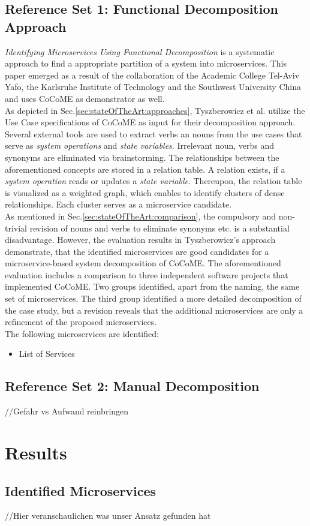 \subsection{Reference Set 1: Functional Decomposition Approach}
\textit{Identifying Microservices Using Functional Decomposition} \cite{FunctionalDecompositionHeinrich} is a systematic approach to find a appropriate partition of a system into microservices. This paper emerged as a result of the collaboration of the Academic College Tel-Aviv Yafo, the Karlsruhe Institute of Technology and the Southwest University China and uses CoCoME as demonstrator as well.\\
As depicted in Sec.\ref{sec:stateOfTheArt:approaches}, Tyszberowicz et al. utilize the Use Case specifications of CoCoME \cite{CoCoMEOld} as input for their decomposition approach. Several external tools are used to extract verbs an nouns from the use cases that serve as \textit{system operations} and \textit{state variables}. Irrelevant noun, verbs and synonyms are eliminated via brainstorming. The relationships between the aforementioned concepts are stored in a relation table. A relation exists, if a \textit{system operation} reads or updates a \textit{state variable}. Thereupon, the relation table is visualized as a weighted graph, which enables to identify clusters of dense relationships. Each cluster serves as a microservice candidate.\\
As mentioned in Sec.\ref{sec:stateOfTheArt:comparison}, the compulsory and non-trivial revision of nouns and verbs to eliminate synonyms etc. is a substantial disadvantage. However, the evaluation results in Tyszberowicz's approach demonstrate, that the identified microservices are good candidates for a microservice-based system decomposition of CoCoME. The aforementioned evaluation includes a comparison to three independent software projects that implemented CoCoME. Two groups identified, apart from the naming, the same set of microservices. The third group identified a more detailed decomposition of the case study, but a revision reveals that the additional microservices are only a refinement of the proposed microservices. \\
The following microservices are identified: 
\begin{itemize}
    \item  List of Services
\end{itemize}

\subsection{Reference Set 2: Manual Decomposition}
//Gefahr vs Aufwand reinbringen


\section{Results}
\label{sec:Evalutation:Results}

\subsection{Identified Microservices}
//Hier veranschaulichen was unser Ansatz gefunden hat


